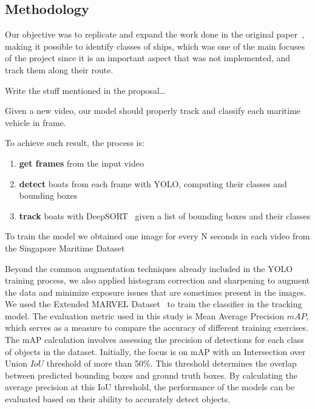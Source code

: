 \documentclass[a4paper,12pt]{article}
\begin{document}
\begin{multicols}{2}
\section{Methodology}\label{sec:methodology}
Our objective was to replicate and expand the work done in the original paper~\cite{MVDTHME}, making it possible to identify classes of ships, which was one of the main focuses of the project since it is an important aspect that was not implemented, and track them along their route.

\hfill\newline
Write the stuff mentioned in the proposal\ldots %
\hfill\newline

Given a new video, our model should properly track and classify each maritime vehicle in frame.

To achieve such result, the process is:
\begin{enumerate}
    \item \textbf{get frames} from the input video
    \item \textbf{detect} boats from each frame with YOLO, computing their classes and bounding boxes
    \item \textbf{track} boats with DeepSORT~\cite{DEEPSORT} given a list of bounding boxes and their classes
\end{enumerate}

To train the model we obtained one image for every N seconds in each video from the Singapore Maritime Dataset~\cite{SINGAPORE}

Beyond the common augmentation techniques already included in the YOLO training process, we also applied histogram correction and sharpening to augment the data and minimize exposure issues that are sometimes present in the images.
We used the Extended MARVEL Dataset~\cite{MARVEL} to train the classifier in the tracking model.
The evaluation metric used in this study is Mean Average Precision \(mAP\), which serves as a measure to compare the accuracy of different training exercises. The mAP calculation involves assessing the precision of detections for each class of objects in the dataset. Initially, the focus is on mAP with an Intersection over Union \(IoU\) threshold of more than 50\%. This threshold determines the overlap between predicted bounding boxes and ground truth boxes. By calculating the average precision at this IoU threshold, the performance of the models can be evaluated based on their ability to accurately detect objects.


\end{multicols}
\end{document}
